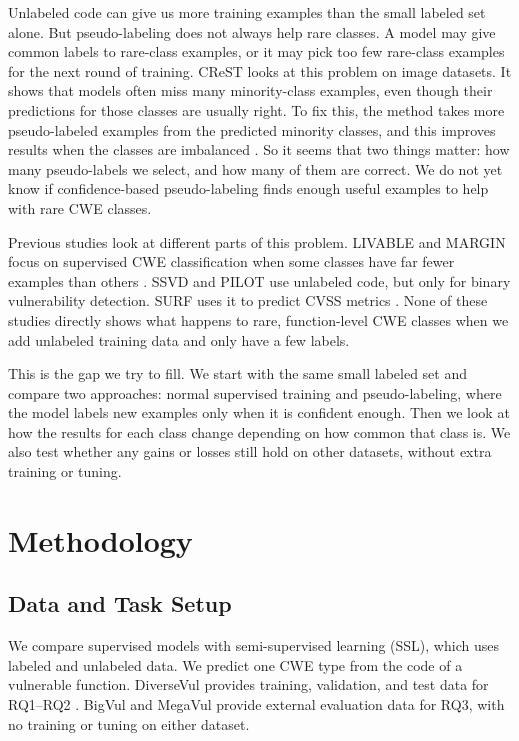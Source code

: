 \documentclass[conference]{IEEEtran}
\begin{document}
Unlabeled code can give us more training examples than the small labeled
set alone. But pseudo-labeling does not always help rare classes. A
model may give common labels to rare-class examples, or it may pick too
few rare-class examples for the next round of training. CReST looks at
this problem on image datasets. It shows that models often miss many
minority-class examples, even though their predictions for those classes
are usually right. To fix this, the method takes more pseudo-labeled
examples from the predicted minority classes, and this improves results
when the classes are imbalanced \cite{wei2021crest}. So it seems that
two things matter: how many pseudo-labels we select, and how many of
them are correct. We do not yet know if confidence-based pseudo-labeling
finds enough useful examples to help with rare CWE classes.

Previous studies look at different parts of this problem. LIVABLE and
MARGIN focus on supervised CWE classification when some classes have far
fewer examples than others \cite{wen2023livable,zhang2026margin}. SSVD
and PILOT use unlabeled code, but only for binary vulnerability
detection. SURF uses it to predict CVSS metrics
\cite{yu2025less,wen2023pilot,pei2025surf}. None of these studies
directly shows what happens to rare, function-level CWE classes when we
add unlabeled training data and only have a few labels.

This is the gap we try to fill. We start with the same small labeled set
and compare two approaches: normal supervised training and
pseudo-labeling, where the model labels new examples only when it is
confident enough. Then we look at how the results for each class change
depending on how common that class is. We also test whether any gains or
losses still hold on other datasets, without extra training or tuning.

\section{Methodology}\label{methodology}

\subsection{Data and Task Setup}\label{data-and-task-setup}

We compare supervised models with semi-supervised learning (SSL), which
uses labeled and unlabeled data. We predict one CWE type from the code
of a vulnerable function. DiverseVul provides training, validation, and
test data for RQ1--RQ2 \cite{chen2023diversevul}. BigVul
\cite{fan2020bigvul} and MegaVul \cite{ni2024megavul} provide external
evaluation data for RQ3, with no training or tuning on either dataset.
\end{document}
